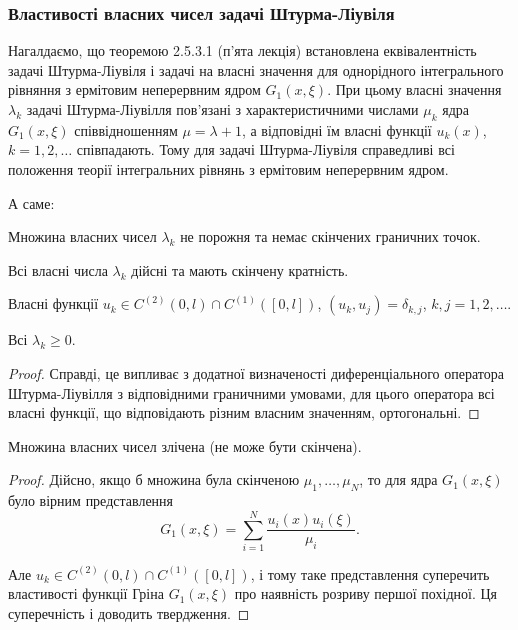 \subsubsection{Властивості власних чисел задачі Штурма-Ліувіля}

Нагалдаємо, що теоремою 2.5.3.1 (п'ята лекція) %
встановлена еквівалентність задачі Штурма-Ліувіля і задачі на власні значення для однорідного інтегрального рівняння з ермітовим неперервним ядром $G_1(x, \xi)$. При цьому власні значення $\lambda_k$ задачі Штурма-Ліувілля пов'язані з характеристичними числами $\mu_k$ ядра $G_1(x, \xi)$ співвідношенням $\mu = \lambda + 1$, а відповідні їм власні функції $u_k(x)$, $k = 1, 2, \ldots$ співпадають. Тому для задачі Штурма-Ліувіля справедливі всі положення теорії інтегральних рівнянь з ермітовим неперервним ядром. \medskip

А саме:
\begin{proposition}
	Множина власних чисел $\lambda_k$ не порожня та немає скінчених граничних точок.
\end{proposition}
	
\begin{proposition}
	Всі власні числа $\lambda_k$ дійсні та мають скінчену кратність.
\end{proposition}
	
\begin{proposition}
	Власні функції $u_k\in C^{(2)}(0,l)\cap C^{(1)}([0, l])$, $(u_k, u_j) = \delta_{k,j}$, $k,j=1,2,\ldots$.
\end{proposition}
	
\begin{proposition}
	Всі $\lambda_k \ge 0$.
\end{proposition}

\begin{proof}
	Справді, це випливає з додатної визначеності диференціального оператора Штурма-Ліувілля з відповідними граничними умовами, для цього оператора всі власні функції, що відповідають різним власним значенням, ортогональні.
\end{proof}

\begin{proposition}
	Множина власних чисел злічена (не може бути скінчена).
\end{proposition}

\begin{proof}
	Дійсно, якщо б множина була скінченою $\mu_1, \ldots, \mu_N$, то для ядра $G_1(x, \xi)$ було вірним представлення 
	\begin{equation}
		G_1(x, \xi) = \sum_{i=1}^N \frac{u_i(x)u_i(\xi)}{\mu_i}.
	\end{equation}

	Але $u_k\in C^{(2)}(0,l)\cap C^{(1)}([0, l])$, і тому таке представлення суперечить властивості функції Гріна $G_1(x, \xi)$ про наявність розриву першої похідної. Ця суперечність і доводить твердження.
\end{proof}

